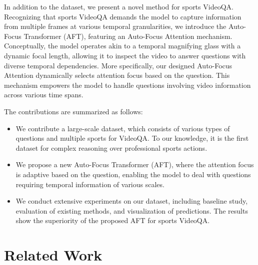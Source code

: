 In addition to the dataset, we present a novel method for sports VideoQA. Recognizing that sports VideoQA demands the model to capture information from multiple frames at various temporal granularities, we introduce the Auto-Focus Transformer (AFT), featuring an Auto-Focus Attention mechanism. Conceptually, the model operates akin to a temporal magnifying glass with a dynamic focal length, allowing it to inspect the video to answer questions with diverse temporal dependencies. More specifically, our designed Auto-Focus Attention dynamically selects attention focus based on the question. This mechanism empowers the model to handle questions involving video information across various time spans.

The contributions are summarized as follows:

\begin{itemize}

    \item We contribute a large-scale dataset, which consists of various types of questions and multiple sports for VideoQA.  %
To our knowledge, it is the first dataset for complex reasoning over professional sports actions. 

    \item We propose a new Auto-Focus Transformer (AFT), where the attention focus is adaptive based on the question,  enabling the model to deal with questions requiring temporal information of various scales.

    \item We conduct extensive experiments on our dataset, including baseline study, evaluation of existing methods, and visualization of predictions. The results show the superiority of the proposed AFT for sports VideoQA. %
\end{itemize}

\section{Related Work}


